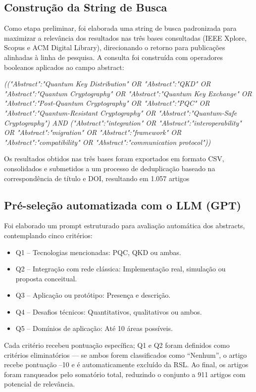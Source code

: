 \documentclass{siintec}
\begin{document}
\subsection{Construção da String de Busca}
Como etapa preliminar, foi elaborada uma string de busca padronizada para maximizar a relevância dos resultados nas três bases consultadas (IEEE Xplore, Scopus e ACM Digital Library), direcionando o retorno para publicações alinhadas à linha de pesquisa. A consulta foi construída com operadores booleanos aplicados ao campo abstract:

\textit{(("Abstract":"Quantum Key Distribution" OR "Abstract":"QKD" OR "Abstract":"Quantum Cryptography" 
OR "Abstract":"Quantum Key Exchange" OR "Abstract":"Post-Quantum Cryptography" OR "Abstract":"PQC" 
OR "Abstract":"Quantum-Resistant Cryptography" OR "Abstract":"Quantum-Safe Cryptography")  
AND  
("Abstract":"integration" OR "Abstract":"interoperability" OR "Abstract":"migration" 
OR "Abstract":"framework" OR "Abstract":"compatibility" OR "Abstract":"communication protocol"))
}

Os resultados obtidos nas três bases foram exportados em formato CSV, consolidados e submetidos a um processo de deduplicação baseado na correspondência de título e DOI, resultando em 1.057 artigos

\subsection{Pré-seleção automatizada com o LLM (GPT)}
Foi elaborado um prompt estruturado para avaliação automática dos abstracts, contemplando cinco critérios:
\begin{itemize}
    \item Q1 – Tecnologias mencionadas: PQC, QKD ou ambas.
    \item Q2 – Integração com rede clássica: Implementação real, simulação ou proposta conceitual.
    \item Q3 – Aplicação ou protótipo: Presença e descrição.
    \item Q4 – Desafios técnicos: Quantitativos, qualitativos ou ambos.
    \item Q5 – Domínios de aplicação: Até 10 áreas possíveis.
\end{itemize}

Cada critério recebeu pontuação específica; Q1 e Q2 foram definidos como critérios eliminatórios — se ambos forem classificados como “Nenhum”, o artigo recebe pontuação –10 e é automaticamente excluído da RSL. Ao final, os artigos foram ranqueados pelo somatório total, reduzindo o conjunto a 911 artigos com potencial de relevância.
\end{document}
